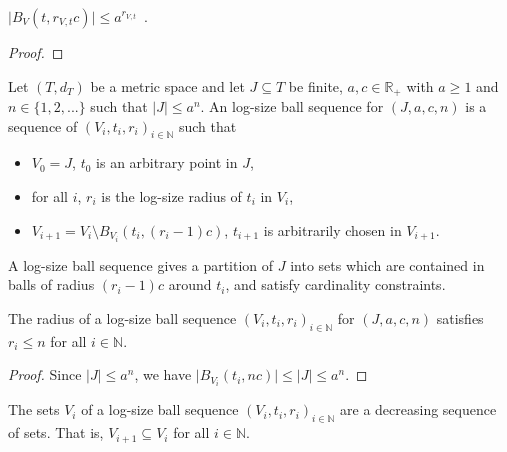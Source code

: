 \begin{lemma}\label{lem:card_logSizeRadius_le}
  \mathlibok
$\vert B_V(t, r_{V,t}c) \vert \le a^{r_{V,t}}$~.
\end{lemma}

\begin{proof}\leanok

\end{proof}


\begin{definition}\label{def:logSizeBallSequence}
  \mathlibok
Let $(T,d_T)$ be a metric space and let $J \subseteq T$ be finite, $a,c \in \mathbb R_+$ with $a \ge 1$ and $n \in \{1, 2, ...\}$ such that $|J| \le a^n$.
An log-size ball sequence for $(J, a, c, n)$ is a sequence of $(V_i, t_i, r_i)_{i \in \mathbb{N}}$ such that
\begin{itemize}
  \item $V_0 = J$, $t_0$ is an arbitrary point in $J$,
  \item for all $i$, $r_i$ is the log-size radius of $t_i$ in $V_i$,
  \item $V_{i+1} = V_i \setminus B_{V_i}(t_i, (r_i - 1)c)$, $t_{i+1}$ is arbitrarily chosen in $V_{i+1}$.
\end{itemize}
\end{definition}

A log-size ball sequence gives a partition of $J$ into sets which are contained in balls of radius $(r_i - 1)c$ around $t_i$, and satisfy cardinality constraints.


\begin{lemma}\label{lem:logSizeRadius_logSizeBallSequence_le}
  \mathlibok
The radius of a log-size ball sequence $(V_i, t_i, r_i)_{i \in \mathbb{N}}$ for $(J, a, c, n)$ satisfies $r_i \le n$ for all $i \in \mathbb{N}$.
\end{lemma}

\begin{proof}
\leanok
Since $|J| \le a^n$, we have $\vert B_{V_i}(t_i, n c) \vert \le \vert J \vert \le a^{n}$.
\end{proof}


\begin{lemma}\label{lem:logSizeBallSequence_V_anti}
  \mathlibok
The sets $V_i$ of a log-size ball sequence $(V_i, t_i, r_i)_{i \in \mathbb{N}}$ are a decreasing sequence of sets. That is, $V_{i+1} \subseteq V_i$ for all $i \in \mathbb{N}$.
\end{lemma}

